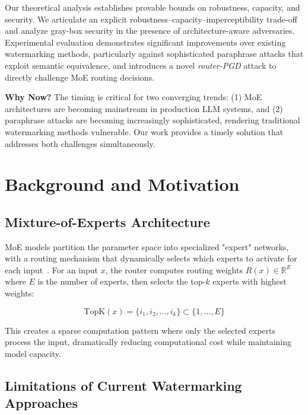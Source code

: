 Our theoretical analysis establishes provable bounds on robustness, capacity, and security. We articulate an explicit robustness--capacity--imperceptibility trade-off and analyze gray-box security in the presence of architecture-aware adversaries. Experimental evaluation demonstrates significant improvements over existing watermarking methods, particularly against sophisticated paraphrase attacks that exploit semantic equivalence, and introduces a novel \emph{router-PGD} attack to directly challenge MoE routing decisions.

\textbf{Why Now?} The timing is critical for two converging trends: (1) MoE architectures are becoming mainstream in production LLM systems, and (2) paraphrase attacks are becoming increasingly sophisticated, rendering traditional watermarking methods vulnerable. Our work provides a timely solution that addresses both challenges simultaneously.

\section{Background and Motivation}

\subsection{Mixture-of-Experts Architecture}

MoE models partition the parameter space into specialized "expert" networks, with a routing mechanism that dynamically selects which experts to activate for each input~\cite{shazeer2017outrageously}. For an input $x$, the router computes routing weights $R(x) \in \mathbb{R}^E$ where $E$ is the number of experts, then selects the top-$k$ experts with highest weights:

\begin{equation}
\text{TopK}(x) = \{i_1, i_2, \ldots, i_k\} \subset \{1, \ldots, E\}
\end{equation}

This creates a sparse computation pattern where only the selected experts process the input, dramatically reducing computational cost while maintaining model capacity.

\subsection{Limitations of Current Watermarking Approaches}


